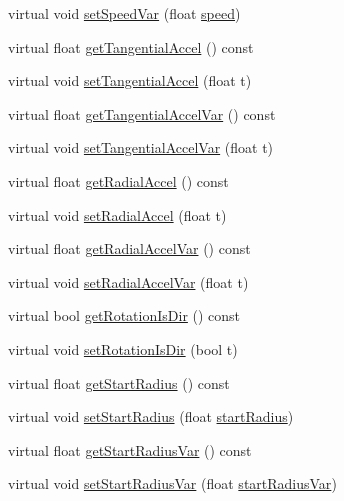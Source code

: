 \begin{DoxyCompactItemize}
\item 
virtual void \hyperlink{classParticleSystem_a9963b2a3f27a63fa0b2d6584bbf2f154}{set\+Speed\+Var} (float \hyperlink{classParticleSystem_a1a4bba0d174d86e0a941b71c1d485b50}{speed})
\item 
virtual float \hyperlink{classParticleSystem_adf8cc5ea0d80bbfd392dc91615b18c8e}{get\+Tangential\+Accel} () const
\item 
virtual void \hyperlink{classParticleSystem_a07973f8b98df652a7b874d6936b29bd8}{set\+Tangential\+Accel} (float t)
\item 
virtual float \hyperlink{classParticleSystem_aaf47f9a0f7445f2b9f93981ac355b79b}{get\+Tangential\+Accel\+Var} () const
\item 
virtual void \hyperlink{classParticleSystem_a30af52fffe71083cf3b87f89d980189b}{set\+Tangential\+Accel\+Var} (float t)
\item 
virtual float \hyperlink{classParticleSystem_a44c1be4035031904d90044a82227f592}{get\+Radial\+Accel} () const
\item 
virtual void \hyperlink{classParticleSystem_adcdaacf01a79421718f2c20e15660c08}{set\+Radial\+Accel} (float t)
\item 
virtual float \hyperlink{classParticleSystem_a31709b2365f5830968148110308ef60a}{get\+Radial\+Accel\+Var} () const
\item 
virtual void \hyperlink{classParticleSystem_a196919735a577b95e4ffe40d1844c08b}{set\+Radial\+Accel\+Var} (float t)
\item 
virtual bool \hyperlink{classParticleSystem_a6c1bd547596cb5bfbc47bc0a864750f4}{get\+Rotation\+Is\+Dir} () const
\item 
virtual void \hyperlink{classParticleSystem_a612d4c50fa3fe077aae1563221c3f5ac}{set\+Rotation\+Is\+Dir} (bool t)
\item 
virtual float \hyperlink{classParticleSystem_aa991ae178766f4eb8ddfb3d3b82154b9}{get\+Start\+Radius} () const
\item 
virtual void \hyperlink{classParticleSystem_a4e8d7237e66e03f81bc1688a5000602f}{set\+Start\+Radius} (float \hyperlink{classParticleSystem_ad3033aadd088e0d11192096f5ad66384}{start\+Radius})
\item 
virtual float \hyperlink{classParticleSystem_aded4933488666cc0ebc079d7c640f4e3}{get\+Start\+Radius\+Var} () const
\item 
virtual void \hyperlink{classParticleSystem_a7a16cb772b67e2f1cf5554692bbe6bc0}{set\+Start\+Radius\+Var} (float \hyperlink{classParticleSystem_a6144edbe628515ebe32c57c2c67e35cc}{start\+Radius\+Var})

\end{DoxyCompactItemize}
